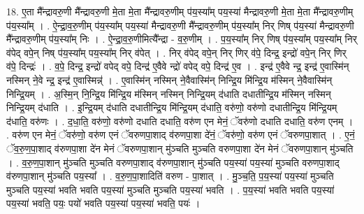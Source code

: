 \documentclass[17pt]{extarticle}
\begin{document}
18. ए॒ता मै᳚न्द्रावरु॒णी मै᳚न्द्रावरु॒णी मे॒ता मे॒ता मै᳚न्द्रावरु॒णीम् प॑य॒स्या᳚म् पय॒स्या॑ मैन्द्रावरु॒णी मे॒ता मे॒ता मै᳚न्द्रावरु॒णीम् प॑य॒स्या᳚म् । . ऐ॒न्द्रा॒व॒रु॒णीम् प॑य॒स्या᳚म् पय॒स्या॑ मैन्द्रावरु॒णी मै᳚न्द्रावरु॒णीम् प॑य॒स्या᳚म् निर् णिष् प॑य॒स्या॑ मैन्द्रावरु॒णी मै᳚न्द्रावरु॒णीम् प॑य॒स्या᳚म् निः । . ऐ॒न्द्रा॒व॒रु॒णीमित्यै᳚न्द्रा - व॒रु॒णीम् । . प॒य॒स्या᳚म् निर् णिष् प॑य॒स्या᳚म् पय॒स्या᳚म् निर् व॑पेद् वपे॒न् निष् प॑य॒स्या᳚म् पय॒स्या᳚म् निर् व॑पेत् । . निर् व॑पेद् वपे॒न् निर् णिर् व॑पे॒ दिन्द्र॒ इन्द्रो॑ वपे॒न् निर् णिर् व॑पे॒ दिन्द्रः॑ । . व॒पे॒ दिन्द्र॒ इन्द्रो॑ वपेद् वपे॒ दिन्द्र॑ ए॒वैवे न्द्रो॑ वपेद् वपे॒ दिन्द्र॑ ए॒व । . इन्द्र॑ ए॒वैवे न्द्र॒ इन्द्र॑ ए॒वास्मि॑न् नस्मिन् ने॒वे न्द्र॒ इन्द्र॑ ए॒वास्मिन्न्॑ । . ए॒वास्मि॑न् नस्मिन् ने॒वैवास्मि॑न् निन्द्रि॒य मि॑न्द्रि॒य म॑स्मिन् ने॒वैवास्मि॑न् निन्द्रि॒यम् । . अ॒स्मि॒न् नि॒न्द्रि॒य मि॑न्द्रि॒य म॑स्मिन् नस्मिन् निन्द्रि॒यम् द॑धाति दधातीन्द्रि॒य म॑स्मिन् नस्मिन् निन्द्रि॒यम् द॑धाति । . इ॒न्द्रि॒यम् द॑धाति दधातीन्द्रि॒य मि॑न्द्रि॒यम् द॑धाति॒ वरु॑णो॒ वरु॑णो दधातीन्द्रि॒य मि॑न्द्रि॒यम् द॑धाति॒ वरु॑णः । . द॒धा॒ति॒ वरु॑णो॒ वरु॑णो दधाति दधाति॒ वरु॑ण एन मेनं॒ ॅवरु॑णो दधाति दधाति॒ वरु॑ण एनम् । . वरु॑ण एन मेनं॒ ॅवरु॑णो॒ वरु॑ण एनं ॅवरुणपा॒शाद् व॑रुणपा॒शा दे॑नं॒ ॅवरु॑णो॒ वरु॑ण एनं ॅवरुणपा॒शात् । . ए॒नं॒ ॅव॒रु॒ण॒पा॒शाद् व॑रुणपा॒शा दे॑न मेनं ॅवरुणपा॒शान् मु॑ञ्चति मुञ्चति वरुणपा॒शा दे॑न मेनं ॅवरुणपा॒शान् मु॑ञ्चति । . व॒रु॒ण॒पा॒शान् मु॑ञ्चति मुञ्चति वरुणपा॒शाद् व॑रुणपा॒शान् मु॑ञ्चति पय॒स्या॑ पय॒स्या॑ मुञ्चति वरुणपा॒शाद् व॑रुणपा॒शान् मु॑ञ्चति पय॒स्या᳚ । . व॒रु॒ण॒पा॒शादिति॑ वरुण - पा॒शात् । . मु॒ञ्च॒ति॒ प॒य॒स्या॑ पय॒स्या॑ मुञ्चति मुञ्चति पय॒स्या॑ भवति भवति पय॒स्या॑ मुञ्चति मुञ्चति पय॒स्या॑ भवति । . प॒य॒स्या॑ भवति भवति पय॒स्या॑ पय॒स्या॑ भवति॒ पयः॒ पयो॑ भवति पय॒स्या॑ पय॒स्या॑ भवति॒ पयः॑ । \newline
\end{document}
